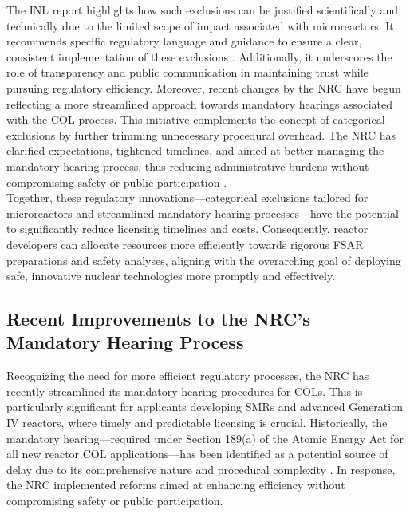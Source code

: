 \documentclass[5p,authoryear]{elsarticle}
\begin{document}
The INL report highlights how such exclusions can be justified scientifically and technically due to the limited scope of impact associated with microreactors. It recommends specific regulatory language and guidance to ensure a clear, consistent implementation of these exclusions \cite{inl2025categorical}. Additionally, it underscores the role of transparency and public communication in maintaining trust while pursuing regulatory efficiency. Moreover, recent changes by the NRC have begun reflecting a more streamlined approach towards mandatory hearings associated with the COL process. This initiative complements the concept of categorical exclusions by further trimming unnecessary procedural overhead. The NRC has clarified expectations, tightened timelines, and aimed at better managing the mandatory hearing process, thus reducing administrative burdens without compromising safety or public participation \cite{hogan2023nrc}.\\

Together, these regulatory innovations—categorical exclusions tailored for microreactors and streamlined mandatory hearing processes—have the potential to significantly reduce licensing timelines and costs. Consequently, reactor developers can allocate resources more efficiently towards rigorous FSAR preparations and safety analyses, aligning with the overarching goal of deploying safe, innovative nuclear technologies more promptly and effectively.\\

\subsection{Recent Improvements to the NRC's Mandatory Hearing Process}
\vspace{0.2cm}

Recognizing the need for more efficient regulatory processes, the NRC has recently streamlined its mandatory hearing procedures for COLs. This is particularly significant for applicants developing SMRs and advanced Generation IV reactors, where timely and predictable licensing is crucial. Historically, the mandatory hearing—required under Section 189(a) of the Atomic Energy Act for all new reactor COL applications—has been identified as a potential source of delay due to its comprehensive nature and procedural complexity \cite{hogan2023nrc}. In response, the NRC implemented reforms aimed at enhancing efficiency without compromising safety or public participation.\\
\end{document}
